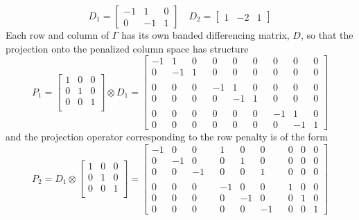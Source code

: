 \documentclass[12pt]{article}
\begin{document}
\[
D_1 = \begin{bmatrix} 
-1 & 1 & 0 \\
0 & -1 & 1 
\end{bmatrix}
\quad
D_2 = \begin{bmatrix} 
1 & -2 & 1 
\end{bmatrix}
\]
Each row and column of $\Gamma$ has its own banded differencing matrix, $D$, so that the projection onto the penalized column space has structure
\[
P_1 = \begin{bmatrix} 
1 & 0 & 0 \\
0 & 1 & 0\\ 
0 & 0 & 1\\ 
\end{bmatrix} \otimes D_1 = \left[ \begin{array}{ccccccccccc}  -1 & 1 & 0  & &  0 & 0 & 0 &  &  0 & 0 & 0  \\
						0 & -1 & 1 & & 0 & 0 & 0 &  &  0 & 0 & 0  \\ 
						&&&&&&&&&&\\
						0 & 0 & 0  & & -1 & 1 & 0  & & 0 & 0 & 0  \\ 
						0 & 0 & 0  & & 0 & -1 & 1 & & 0 & 0 & 0  \\ 
						&&&&&&&&&&\\
						0 & 0 & 0  & & 0 & 0 & 0 &  & -1 & 1 & 0  \\
						0 & 0 & 0  & & 0 & 0 & 0 &  &  0 & -1 & 1  
						\end{array} \right] 
\]
\noindent 
and the projection operator corresponding to the row penalty is of the form
\[
P_2 = D_1 \otimes \begin{bmatrix} 
					1 & 0 & 0 \\
					0 & 1 & 0\\ 
					0 & 0 & 1\\ 
					\end{bmatrix} = \left[ \begin{array}{ccccccccccc}  -1 & 0 & 0  & &  1 & 0 & 0 &  &  0 & 0 & 0  \\
														   0 & -1 & 0 & & 0 & 1 & 0 &  &  0 & 0 & 0  \\ 
														   0 & 0 & -1  & & 0 & 0 & 1  & & 0 & 0 & 0  \\ 
														   &&&&&&&&&&\\					
														   0 & 0 & 0  & & -1 & 0 & 0 &   & 1 & 0 & 0  \\ 
														   0 & 0 & 0  & & 0 & -1 & 0 &  & 0 & 1 & 0  \\
														   0 & 0 & 0  & & 0 & 0 & -1 &  &  0 & 0 & 1  
														  \end{array} \right] 
\]
\end{document}
